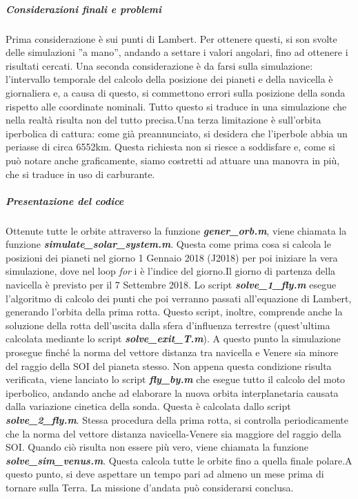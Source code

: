 \documentclass[a4paper]{article}
\begin{document}
\subparagraph{Considerazioni finali e problemi\newline}
Prima considerazione è sui punti di Lambert. Per ottenere questi, si son svolte delle simulazioni ''a mano'', andando a settare i valori angolari, fino ad ottenere i risultati cercati. \newline Una seconda considerazione è da farsi sulla simulazione: l'intervallo temporale del calcolo della posizione dei pianeti e della navicella è giornaliera e, a causa di questo, si commettono errori sulla posizione della sonda rispetto alle coordinate nominali. Tutto questo si traduce in una simulazione che nella realtà risulta non del tutto precisa.\newline Una terza limitazione è sull'orbita iperbolica di cattura: come già preannunciato, si desidera che l'iperbole abbia un periasse di circa 6552km. Questa richiesta non si riesce a soddisfare e, come si può notare anche graficamente, siamo costretti ad attuare una manovra in più, che si traduce in uso di carburante.
\subparagraph{Presentazione del codice\newline}
Ottenute tutte le orbite attraverso la funzione \textit{\textbf{gener\_orb.m}}, viene chiamata la funzione \textit{\textbf{simulate\_solar\_system.m}}. Questa come prima cosa si calcola le posizioni dei pianeti nel giorno 1 Gennaio 2018 (J2018) per poi iniziare la vera simulazione, dove nel loop \textit{for} i è l'indice del giorno.\newline Il giorno di partenza della navicella è previsto per il 7 Settembre 2018. Lo script \textit{\textbf{solve\_1\_fly.m}} esegue l'algoritmo di calcolo dei punti che poi verranno passati all'equazione di Lambert, generando l'orbita della prima rotta. Questo script, inoltre, comprende anche la soluzione della rotta dell'uscita dalla sfera d'influenza terrestre (quest'ultima calcolata mediante lo script \textit{\textbf{solve\_exit\_T.m}}). \newline A questo punto la simulazione prosegue finché la norma del vettore distanza tra navicella e Venere sia minore del raggio della SOI del pianeta stesso. \newline Non appena questa condizione risulta verificata, viene lanciato lo script \textit{\textbf{fly\_by.m}} che esegue tutto il calcolo del moto iperbolico, andando anche ad elaborare la nuova orbita interplanetaria causata dalla variazione cinetica della sonda. Questa è calcolata dallo script \textit{\textbf{solve\_2\_fly.m}}. \newline Stessa procedura della prima rotta, si controlla periodicamente che la norma del vettore distanza navicella-Venere sia maggiore del raggio della SOI. Quando ciò risulta non essere più vero, viene chiamata la funzione \textit{\textbf{solve\_sim\_venus.m}}. Questa calcola tutte le orbite fino a quella finale polare.\newline A questo punto, si deve aspettare un tempo pari ad almeno un mese prima di tornare sulla Terra. La missione d'andata può considerarsi conclusa.
\end{document}
